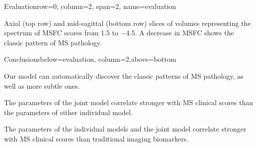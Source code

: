 \documentclass[%
landscape,paperwidth=42in,paperheight=48in,%
margin=2cm,
fontscale=0.295
]{baposter}
\begin{document}
\begin{poster}
\begin{headerblock}{Evaluation}{row=0, column=2, span=2,
name=evaluation}
\begin{compactitem}
\item Axial (top row) and mid-sagittal (bottom row) slices of volumes
representing the spectrum of MSFC scores from \num{1.5} to \num{-4.5}. A
decrease in MSFC shows the classic pattern of MS pathology.
\end{compactitem}
\begin{center}
\quad
{}
\end{center}

\end{headerblock}

\begin{headerblock}{Conclusions}{below=evaluation, column=2,above=bottom}
\begin{compactitem} 
  \item Our model can automatically discover the classic patterns of MS
  pathology, as well as more subtle ones.
  \item The parameters of the joint model correlate stronger with MS clinical
  scores than the parameters of either individual model.
  \item The parameters of the individual models and the joint model correlate
  stronger with MS clinical scores than traditional imaging biomarkers.
\end{compactitem} 
\end{headerblock}



\end{poster}
\end{document}

